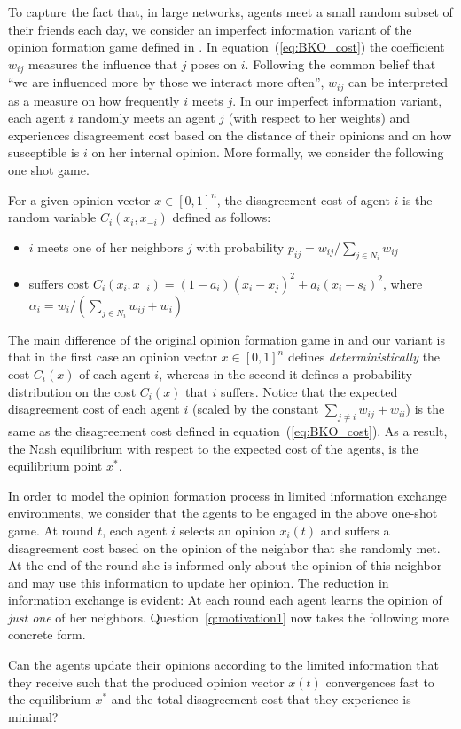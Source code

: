 To capture the fact that, in large networks, agents meet a small random subset
of their friends each day, we consider an imperfect information variant of the
opinion formation game defined in \cite{BKO11}. In equation~(\ref{eq:BKO_cost})
the coefficient $w_{ij}$ measures the influence that $j$ poses on $i$.
Following the common belief that \enquote{we are influenced more by those we
  interact more often}, $w_{ij}$ can be interpreted as a measure on how
frequently $i$ meets $j$. In our imperfect information variant, each agent $i$
randomly meets an agent $j$ (with respect to her weights) and experiences
disagreement cost based on the distance of their opinions and on how
susceptible is $i$ on her internal opinion. More formally, we consider the
following one shot game.
%
\begin{definition}\label{d:random_game}
  For a given opinion vector $x \in [0,1]^n$, the disagreement cost of agent
  $i$ is the random variable $C_i(x_i,x_{-i})$ defined as follows:
  \begin{itemize}
    \item $i$ meets one of her neighbors $j$ with probability $p_{ij}=
      w_{ij}/\sum_{j\in N_i}w_{ij}$
    \item suffers cost $C_i(x_i , x_{-i}) = (1-a_i)(x_i-x_j)^2 +
      a_i(x_i-s_i)^2$, where $\alpha_i = w_i/(\sum_{j\in N_i}w_{ij}+w_i)$
  \end{itemize}
\end{definition}
%
The main difference of the original opinion formation game in \cite{BKO11} and
our variant is that in the first case an opinion vector $x\in [0,1]^n$ defines
\emph{deterministically} the cost $C_i(x)$ of each agent $i$, whereas in the
second it defines a probability distribution on the cost $C_i(x)$ that $i$
suffers. Notice that the expected disagreement cost of each agent $i$ (scaled
by the constant $\sum_{j\neq i}w_{ij}+w_{ii}$) is the same as the disagreement
cost defined in equation~(\ref{eq:BKO_cost}).  As a result, the Nash
equilibrium with respect to the expected cost of the agents, is the equilibrium
point $x^*$.

In order to model the opinion formation process in limited information exchange
environments, we consider that the agents to be engaged in the above one-shot
game. At round $t$, each agent $i$ selects an opinion $x_i(t)$ and suffers a
disagreement cost based on the opinion of the neighbor that she randomly met.
At the end of the round she is informed only about the opinion of this neighbor
and may use this information to update her opinion. The reduction in
information exchange is evident: At each round each agent learns the opinion of
\emph{just one} of her neighbors.  Question~\ref{q:motivation1} now takes the
following more concrete form.
%
\begin{question}\label{q:motivation2}
  Can the agents update their opinions according to the limited information
  that they receive such that the produced opinion vector $x(t)$ convergences
  fast to the equilibrium $x^*$ and the total disagreement cost that they
  experience is minimal?
\end{question}

